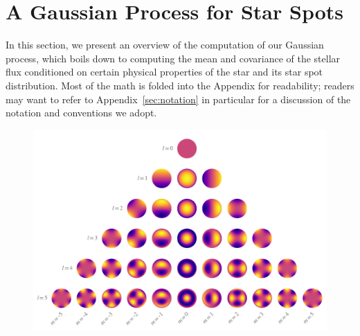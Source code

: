 \documentclass[modern]{aastex62}
\begin{document}

\section{A Gaussian Process for Star Spots}
\label{sec:main}

In this section, we present an overview of the computation of our Gaussian
process, which boils down to computing the mean and covariance of the stellar
flux conditioned on certain physical properties of the star and its star spot
distribution. Most of the math is folded into the Appendix for readability;
readers may want to refer to Appendix~\ref{sec:notation} in particular for
a discussion of the notation and conventions we adopt.

\begin{figure}[t!]
    \begin{centering}
        \includegraphics[width=\linewidth]{figures/ylms.pdf}
    \end{centering}
\end{figure}
\end{document}
